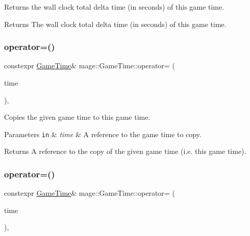 Returns the wall clock total delta time (in seconds) of this game time.

\begin{DoxyReturn}{Returns}
The wall clock total delta time (in seconds) of this game time. 
\end{DoxyReturn}
\hypertarget{classmage_1_1_game_time_a7ebc520cb69228e457c24958e7b97baa}{}\label{classmage_1_1_game_time_a7ebc520cb69228e457c24958e7b97baa} 
\subsubsection{\texorpdfstring{operator=()}{operator=()}\hspace{0.1cm}{\footnotesize\ttfamily [1/2]}}
{\footnotesize\ttfamily constexpr \hyperlink{classmage_1_1_game_time}{Game\+Time}\& mage\+::\+Game\+Time\+::operator= (\begin{DoxyParamCaption}\item[{const \hyperlink{classmage_1_1_game_time}{Game\+Time} \&}]{time }\end{DoxyParamCaption})\hspace{0.3cm}{\ttfamily [default]}, {\ttfamily [noexcept]}}

Copies the given game time to this game time.


\begin{DoxyParams}[1]{Parameters}
\mbox{\tt in}  & {\em time} & A reference to the game time to copy. \\
\hline
\end{DoxyParams}
\begin{DoxyReturn}{Returns}
A reference to the copy of the given game time (i.\+e. this game time). 
\end{DoxyReturn}
\hypertarget{classmage_1_1_game_time_a79756019f21b5125114483ddc71247fe}{}\label{classmage_1_1_game_time_a79756019f21b5125114483ddc71247fe} 
\subsubsection{\texorpdfstring{operator=()}{operator=()}\hspace{0.1cm}{\footnotesize\ttfamily [2/2]}}
{\footnotesize\ttfamily constexpr \hyperlink{classmage_1_1_game_time}{Game\+Time}\& mage\+::\+Game\+Time\+::operator= (\begin{DoxyParamCaption}\item[{\hyperlink{classmage_1_1_game_time}{Game\+Time} \&\&}]{time }\end{DoxyParamCaption})\hspace{0.3cm}{\ttfamily [default]}, {\ttfamily [noexcept]}}

